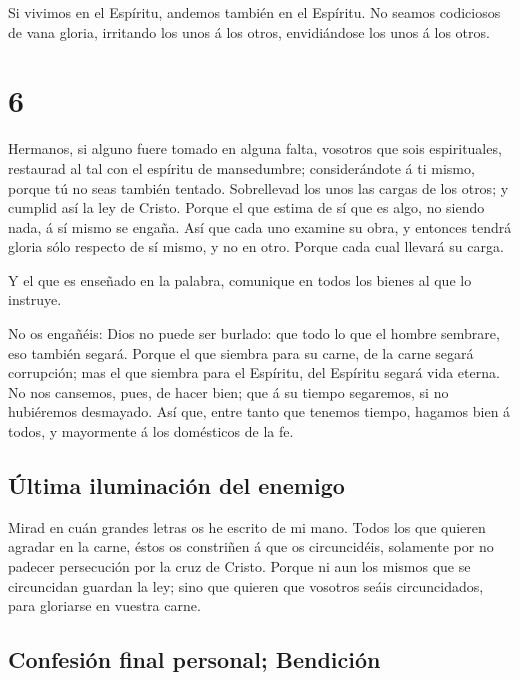  Si vivimos en el Espíritu, andemos también en el
Espíritu.  No seamos codiciosos de vana gloria, irritando
los unos á los otros, envidiándose los unos á los otros.

\hypertarget{section-48-6}{%
\section{6}\label{section-48-6}}

 Hermanos, si alguno fuere tomado en alguna falta,
vosotros que sois espirituales, restaurad al tal con el espíritu de
mansedumbre; considerándote á ti mismo, porque tú no seas también
tentado.  Sobrellevad los unos las cargas de los otros; y
cumplid así la ley de Cristo.  Porque el que estima de sí
que es algo, no siendo nada, á sí mismo se engaña.  Así
que cada uno examine su obra, y entonces tendrá gloria sólo respecto de
sí mismo, y no en otro.  Porque cada cual llevará su
carga.

 Y el que es enseñado en la palabra, comunique en todos
los bienes al que lo instruye.

 No os engañéis: Dios no puede ser burlado: que todo lo
que el hombre sembrare, eso también segará.  Porque el que
siembra para su carne, de la carne segará corrupción; mas el que siembra
para el Espíritu, del Espíritu segará vida eterna.  No nos
cansemos, pues, de hacer bien; que á su tiempo segaremos, si no
hubiéremos desmayado.  Así que, entre tanto que tenemos
tiempo, hagamos bien á todos, y mayormente á los domésticos de la fe.

\hypertarget{uxfaltima-iluminaciuxf3n-del-enemigo}{%
\subsection{Última iluminación del
enemigo}\label{uxfaltima-iluminaciuxf3n-del-enemigo}}

 Mirad en cuán grandes letras os he escrito de mi mano.
 Todos los que quieren agradar en la carne, éstos os
constriñen á que os circuncidéis, solamente por no padecer persecución
por la cruz de Cristo.  Porque ni aun los mismos que se
circuncidan guardan la ley; sino que quieren que vosotros seáis
circuncidados, para gloriarse en vuestra carne.

\hypertarget{confesiuxf3n-final-personal-bendiciuxf3n}{%
\subsection{Confesión final personal;
Bendición}\label{confesiuxf3n-final-personal-bendiciuxf3n}}

